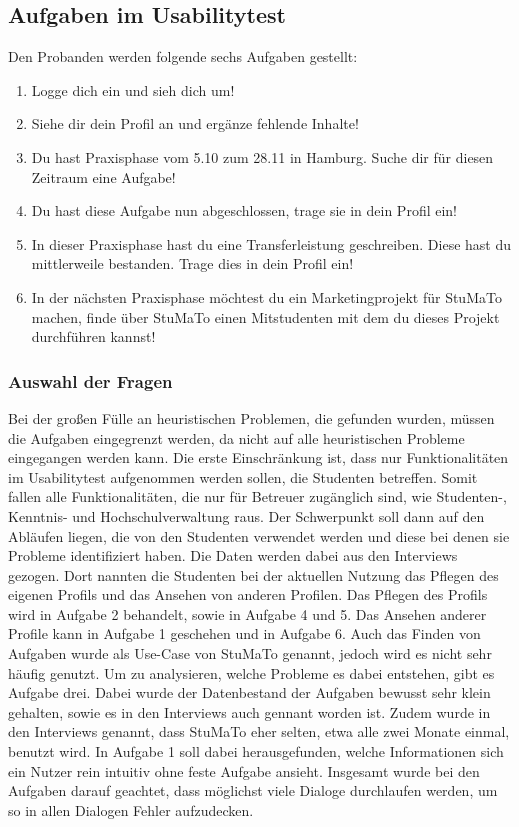 \documentclass[
  12pt,
  ngerman,
  a4paper,
]{article}
\providecommand{\tightlist}{%
  \setlength{\itemsep}{0pt}\setlength{\parskip}{0pt}}
\begin{document}
\hypertarget{aufgaben-im-usabilitytest}{%
\subsection{Aufgaben im Usabilitytest}\label{aufgaben-im-usabilitytest}}

Den Probanden werden folgende sechs Aufgaben gestellt:

\begin{enumerate}
\def\labelenumi{\arabic{enumi}.}
\tightlist
\item
  Logge dich ein und sieh dich um!
\item
  Siehe dir dein Profil an und ergänze fehlende Inhalte!
\item
  Du hast Praxisphase vom 5.10 zum 28.11 in Hamburg. Suche dir für
  diesen Zeitraum eine Aufgabe!
\item
  Du hast diese Aufgabe nun abgeschlossen, trage sie in dein Profil ein!
\item
  In dieser Praxisphase hast du eine Transferleistung geschreiben. Diese
  hast du mittlerweile bestanden. Trage dies in dein Profil ein!
\item
  In der nächsten Praxisphase möchtest du ein Marketingprojekt für
  StuMaTo machen, finde über StuMaTo einen Mitstudenten mit dem du
  dieses Projekt durchführen kannst!
\end{enumerate}

\hypertarget{auswahl-der-fragen}{%
\subsubsection{Auswahl der Fragen}\label{auswahl-der-fragen}}

Bei der großen Fülle an heuristischen Problemen, die gefunden wurden,
müssen die Aufgaben eingegrenzt werden, da nicht auf alle heuristischen
Probleme eingegangen werden kann. Die erste Einschränkung ist, dass nur
Funktionalitäten im Usabilitytest aufgenommen werden sollen, die
Studenten betreffen. Somit fallen alle Funktionalitäten, die nur für
Betreuer zugänglich sind, wie Studenten-, Kenntnis- und
Hochschulverwaltung raus. Der Schwerpunkt soll dann auf den Abläufen
liegen, die von den Studenten verwendet werden und diese bei denen sie
Probleme identifiziert haben. Die Daten werden dabei aus den Interviews
gezogen. Dort nannten die Studenten bei der aktuellen Nutzung das
Pflegen des eigenen Profils und das Ansehen von anderen Profilen. Das
Pflegen des Profils wird in Aufgabe 2 behandelt, sowie in Aufgabe 4 und
5. Das Ansehen anderer Profile kann in Aufgabe 1 geschehen und in
Aufgabe 6. Auch das Finden von Aufgaben wurde als Use-Case von StuMaTo
genannt, jedoch wird es nicht sehr häufig genutzt. Um zu analysieren,
welche Probleme es dabei entstehen, gibt es Aufgabe drei. Dabei wurde
der Datenbestand der Aufgaben bewusst sehr klein gehalten, sowie es in
den Interviews auch gennant worden ist. Zudem wurde in den Interviews
genannt, dass StuMaTo eher selten, etwa alle zwei Monate einmal, benutzt
wird. In Aufgabe 1 soll dabei herausgefunden, welche Informationen sich
ein Nutzer rein intuitiv ohne feste Aufgabe ansieht. Insgesamt wurde bei
den Aufgaben darauf geachtet, dass möglichst viele Dialoge durchlaufen
werden, um so in allen Dialogen Fehler aufzudecken.
\end{document}
